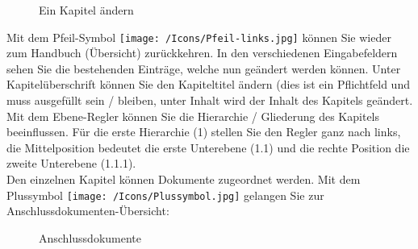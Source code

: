 \begin{figure}[H]
\caption{Ein Kapitel ändern}
\end{figure}

Mit dem Pfeil-Symbol \texttt{[image: /Icons/Pfeil-links.jpg]}  können Sie wieder zum Handbuch (Übersicht) zurückkehren. In den verschiedenen Eingabefeldern sehen Sie die bestehenden Einträge, welche nun geändert werden können. Unter Kapitelüberschrift  können Sie den Kapiteltitel ändern (dies ist ein Pflichtfeld und muss ausgefüllt sein / bleiben, unter Inhalt  wird der Inhalt des Kapitels geändert. Mit dem Ebene-Regler  können Sie die Hierarchie / Gliederung des Kapitels beeinflussen. Für die erste Hierarchie (1) stellen Sie den Regler ganz nach links, die Mittelposition bedeutet die erste Unterebene (1.1) und die rechte Position die zweite Unterebene (1.1.1). \\

Den einzelnen Kapitel können Dokumente zugeordnet werden. Mit dem Plussymbol \texttt{[image: /Icons/Plussymbol.jpg]}  gelangen Sie zur Anschlussdokumenten-Übersicht:

\begin{figure}[H]
\caption{Anschlussdokumente}
\end{figure}

